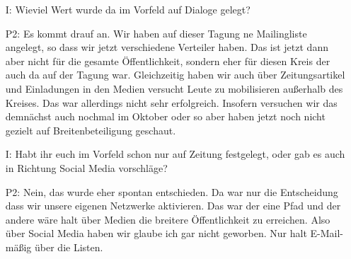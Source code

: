 \begin{itemize}
    \item[I:] Wieviel Wert wurde da im Vorfeld auf Dialoge gelegt?
    \item[P2:] Es kommt drauf an. Wir haben auf dieser Tagung ne Mailingliste angelegt, so dass wir jetzt verschiedene Verteiler haben. Das ist jetzt dann aber nicht f{\"u}r die gesamte {\"O}ffentlichkeit, sondern eher f{\"u}r diesen Kreis der auch da auf der Tagung war. Gleichzeitig haben wir auch {\"u}ber Zeitungsartikel und Einladungen in den Medien versucht Leute zu mobilisieren au{\ss}erhalb des Kreises. Das war allerdings nicht sehr erfolgreich. Insofern versuchen wir das demn{\"a}chst auch nochmal im Oktober oder so aber haben jetzt noch nicht gezielt auf Breitenbeteiligung geschaut.
    \item[I:] Habt ihr euch im Vorfeld schon nur auf Zeitung festgelegt, oder gab es auch in Richtung Social Media vorschl{\"a}ge?
    \item[P2:] Nein, das wurde eher spontan entschieden. Da war nur die Entscheidung dass wir unsere eigenen Netzwerke aktivieren. Das war der eine Pfad und der andere w{\"a}re halt {\"u}ber Medien die breitere {\"O}ffentlichkeit zu erreichen. Also {\"u}ber Social Media haben wir glaube ich gar nicht geworben. Nur halt E-Mail-m{\"a}{\ss}ig {\"u}ber die Listen.
\end{itemize}

